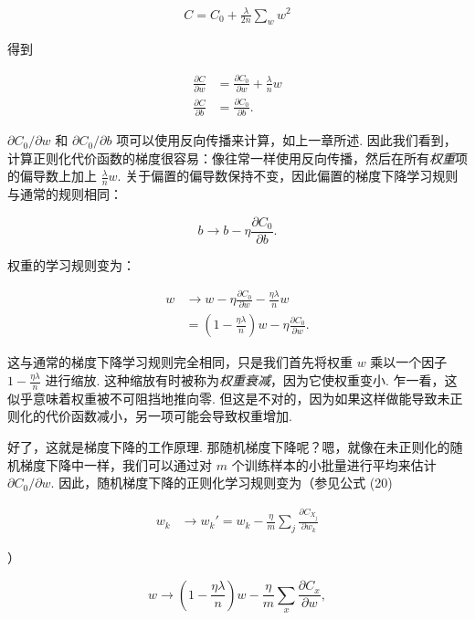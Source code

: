 \begin{align*}
C = C_0 + \frac{\lambda}{2n} \sum_w w^2 \nonumber
\end{align*}

\noindent 得到

\begin{align}
\frac{\partial C}{\partial w} &= \frac{\partial C_0}{\partial w} + \frac{\lambda}{n} w \tag{88} \\ \frac{\partial C}{\partial b} &= \frac{\partial C_0}{\partial b}. \tag{89}
\end{align}

\noindent $\partial C_0 / \partial w$ 和 $\partial C_0 / \partial b$ 项可以使用反向传播来计算，如上一章所述. 因此我们看到，计算正则化代价函数的梯度很容易：像往常一样使用反向传播，然后在所有\emph{权重}项的偏导数上加上 $\frac{\lambda}{n} w$. 关于偏置的偏导数保持不变，因此偏置的梯度下降学习规则与通常的规则相同：

\begin{equation}
b \rightarrow b -\eta \frac{\partial C_0}{\partial b}.
\tag{90}
\end{equation}

\noindent 权重的学习规则变为：

\begin{align}
w &\rightarrow w-\eta \frac{\partial C_0}{\partial w}-\frac{\eta \lambda}{n} w \tag{91} \\ &= \left(1-\frac{\eta \lambda}{n}\right) w -\eta \frac{\partial C_0}{\partial w}. \tag{92}
\end{align}

\noindent 这与通常的梯度下降学习规则完全相同，只是我们首先将权重 $w$ 乘以一个因子 $1-\frac{\eta \lambda}{n}$ 进行缩放. 这种缩放有时被称为\emph{权重衰减}，因为它使权重变小. 乍一看，这似乎意味着权重被不可阻挡地推向零. 但这是不对的，因为如果这样做能导致未正则化的代价函数减小，另一项可能会导致权重增加.

好了，这就是梯度下降的工作原理. 那随机梯度下降呢？嗯，就像在未正则化的随机梯度下降中一样，我们可以通过对 $m$ 个训练样本的小批量进行平均来估计 $\partial C_0 / \partial w$. 因此，随机梯度下降的正则化学习规则变为（参见公式 (20)

\begin{align*}
w_k &\rightarrow w_k' = w_k-\frac{\eta}{m} \sum_j \frac{\partial C_{X_j}}{\partial w_k} \nonumber
\end{align*}

\noindent ）

\begin{equation}
w \rightarrow \left(1-\frac{\eta \lambda}{n}\right) w -\frac{\eta}{m} \sum_x \frac{\partial C_x}{\partial w},
\tag{93}
\end{equation}


